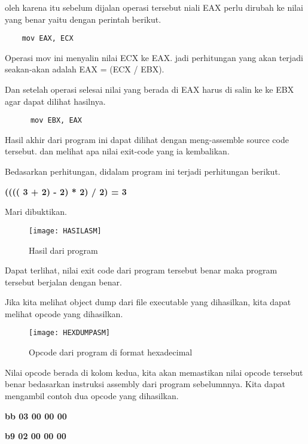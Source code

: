 \begin{enumerate}
    oleh karena itu sebelum dijalan operasi tersebut niali EAX perlu dirubah ke nilai yang benar
    yaitu dengan perintah berikut.

    \begin{lstlisting}
    mov EAX, ECX
    \end{lstlisting}

    Operasi mov ini menyalin nilai ECX ke EAX. jadi perhitungan yang akan terjadi
    seakan-akan adalah EAX = (ECX / EBX).

    Dan setelah operasi selesai nilai yang berada di EAX harus di salin ke ke EBX agar
    dapat dilihat hasilnya.

    \begin{lstlisting}
      mov EBX, EAX
    \end{lstlisting}

\end{enumerate}

Hasil akhir dari program ini dapat dilihat dengan meng-assemble source code tersebut.
dan melihat apa nilai exit-code yang ia kembalikan.

Bedasarkan perhitungan, didalam program ini terjadi perhitungan berikut.

\textbf{(((( 3 + 2) - 2) * 2) / 2) = 3}

Mari dibuktikan.

\begin{figure}[h]
    \centering
    \texttt{[image: HASILASM]}
    \caption{Hasil dari program}
    \label{fig:HASILASM}
\end{figure}

Dapat terlihat, nilai exit code dari program tersebut benar maka program
tersebut berjalan dengan benar.

\newpage

Jika kita melihat object dump dari file executable yang dihasilkan, kita dapat
melihat opcode yang dihasilkan.

\begin{figure}[h]
    \centering
    \texttt{[image: HEXDUMPASM]}
    \caption{Opcode dari program di format hexadecimal}
    \label{fig:HEXDUMPASM}
\end{figure}

Nilai opcode berada di kolom kedua, kita akan memastikan nilai opcode tersebut
benar bedasarkan instruksi assembly dari program sebelumnnya.
Kita dapat mengambil contoh dua opcode yang dihasilkan.

\begin{center}
\textbf{bb 03 00 00 00}

\textbf{b9 02 00 00 00}
\end{center}

